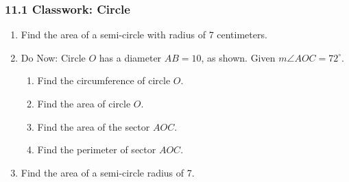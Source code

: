 

\fancyhead[LE]{\thepage}



\subsubsection*{11.1 Classwork: Circle }
\begin{enumerate}
\item Find the area of a semi-circle with radius of 7 centimeters. \vspace{2cm}

\item Do Now: Circle $O$ has a diameter $AB=10$, as shown. Given $m\angle AOC=72^\circ$. 
\begin{multicols}{2}
  \raggedcolumns
  \begin{enumerate}[itemsep=1.5cm]
    \item Find the circumference of circle $O$.
    \item Find the area of circle $O$. 
    \item Find the area of the sector $AOC$. 
    \item Find the perimeter of sector $AOC$.
  \end{enumerate}
  \begin{center}
  \end{center}
\end{multicols} \vspace{1cm}

\newpage
\item Find the area of a semi-circle radius of 7. \vspace{2cm}


\end{enumerate}
